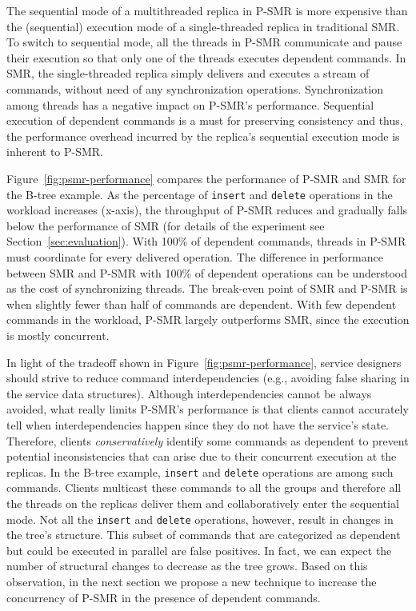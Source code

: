 \documentclass[conference]{IEEEtran}
\begin{document}
The sequential mode of a multithreaded replica in P-SMR is more expensive than the (sequential) execution mode of a single-threaded replica in traditional SMR. 
To switch to sequential mode, all the threads in P-SMR communicate and pause their execution so that only one of the threads executes dependent commands. 
In SMR, the single-threaded replica simply delivers and executes a stream of commands, without need of any synchronization operations.
Synchronization among threads has a negative impact on P-SMR's performance. 
Sequential execution of dependent commands is a must for preserving consistency and thus, the performance overhead incurred by the replica's sequential execution mode is inherent to P-SMR. 

Figure~\ref{fig:psmr-performance} compares the performance of P-SMR and SMR for the B-tree example. 
As the percentage of \texttt{insert} and \texttt{delete} operations in the workload increases (x-axis), the throughput of P-SMR reduces and gradually falls below the performance of SMR (for details of the experiment see Section~\ref{sec:evaluation}). With 100\% of dependent commands, threads in P-SMR must coordinate for every delivered operation.
The difference in performance between SMR and P-SMR with 100\% of dependent operations can be understood as the cost of synchronizing threads.
The break-even point of SMR and P-SMR is when slightly fewer than half of commands are dependent.
With few dependent commands in the workload, P-SMR largely outperforms SMR, since the execution is mostly concurrent.

In light of the tradeoff shown in Figure~\ref{fig:psmr-performance}, service designers should strive to reduce command interdependencies (e.g., avoiding false sharing in the service data structures).
Although interdependencies cannot be always avoided, what really limits P-SMR's performance is that clients cannot accurately tell when interdependencies happen since they do not have the service's state.
Therefore, clients \emph{conservatively} identify some commands as dependent to prevent potential inconsistencies that can arise due to their concurrent execution at the replicas. 
In the B-tree example, \texttt{insert} and \texttt{delete} operations are among such commands. Clients multicast these commands to all the groups and therefore all the threads on the replicas deliver them and collaboratively enter the sequential mode. 
Not all the \texttt{insert} and \texttt{delete} operations, however, result in changes in the tree's structure. 
This subset of commands that are categorized as dependent but could be executed in parallel are false positives. 
In fact, we can expect the number of structural changes to decrease as the tree grows.
Based on this observation, in the next section we propose a new technique to increase the concurrency of P-SMR in the presence of  dependent commands. 
\end{document}
